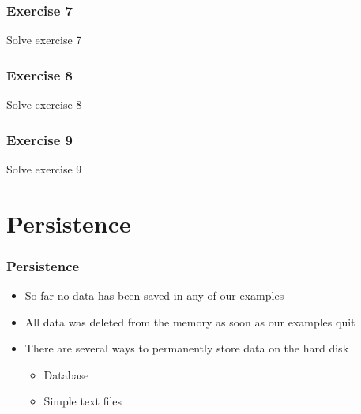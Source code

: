 \documentclass[10pt, a4paper]{beamer} %
\begin{document}
{
\bfseries
\begin{frame}[c]\frametitle{Exercise 7}
  Solve exercise 7
\end{frame}

\begin{frame}[c]\frametitle{Exercise 8}
  Solve exercise 8
\end{frame}

\begin{frame}[c, fragile]\frametitle{Exercise 9}
  Solve exercise 9
\end{frame}

}


\section{Persistence} %
\label{sec:persistence}

\begin{frame}[c, fragile]\frametitle{Persistence}
  \begin{itemize}
    \item So far no data has been saved in any of our examples
    \item All data was deleted from the memory as soon as our examples quit
    \item There are several ways to permanently store data on the hard disk
          \begin{itemize}
            \item Database
            \item Simple text files
          \end{itemize}
  \end{itemize}
\end{frame}
\end{document}
